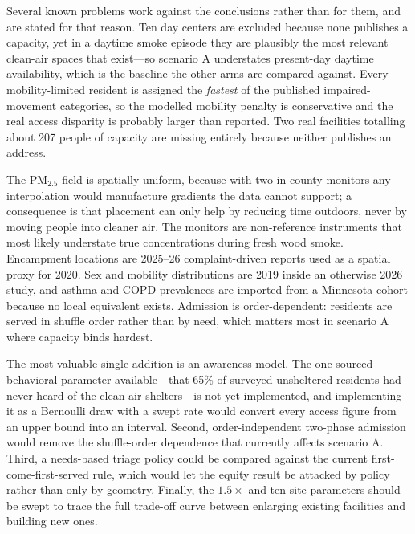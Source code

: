 \documentclass[graybox]{svmult}
\begin{document}
 Several known problems work
against the conclusions rather than for them, and are stated for that reason.
Ten day centers are excluded because none publishes a capacity, yet in a daytime
smoke episode they are plausibly the most relevant clean-air spaces that
exist---so scenario A understates present-day daytime availability, which is the
baseline the other arms are compared against. Every mobility-limited resident is
assigned the \emph{fastest} of the published impaired-movement categories, so the
modelled mobility penalty is conservative and the real access disparity is
probably larger than reported. Two real facilities totalling about 207 people of
capacity are missing entirely because neither publishes an address.

 The PM$_{2.5}$ field is spatially uniform,
because with two in-county monitors any interpolation would manufacture gradients
the data cannot support; a consequence is that placement can only help by
reducing time outdoors, never by moving people into cleaner air. The monitors are
non-reference instruments that most likely understate true concentrations during
fresh wood smoke. Encampment locations are 2025--26 complaint-driven reports used
as a spatial proxy for 2020. Sex and mobility distributions are 2019 inside an
otherwise 2026 study, and asthma and COPD prevalences are imported from a
Minnesota cohort because no local equivalent exists. Admission is
order-dependent: residents are served in shuffle order rather than by need, which
matters most in scenario A where capacity binds hardest.

 The most valuable single addition is an awareness model.
The one sourced behavioral parameter available---that 65\% of surveyed
unsheltered residents had never heard of the clean-air shelters---is not yet
implemented, and implementing it as a Bernoulli draw with a swept rate would
convert every access figure from an upper bound into an interval. Second,
order-independent two-phase admission would remove the shuffle-order dependence
that currently affects scenario A. Third, a needs-based triage policy could be
compared against the current first-come-first-served rule, which would let the
equity result be attacked by policy rather than only by geometry. Finally, the
$1.5\times$ and ten-site parameters should be swept to trace the full trade-off
curve between enlarging existing facilities and building new ones.
\end{document}
